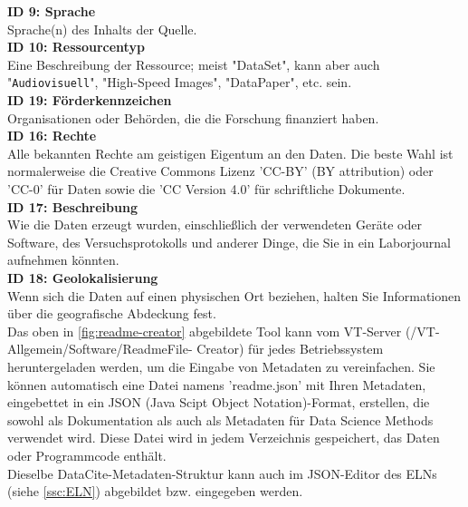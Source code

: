 %
\textbf{ID 9: Sprache} \\
Sprache(n) des Inhalts der Quelle. \\[6pt]
%
\textbf{ID 10: Ressourcentyp} \\
Eine Beschreibung der Ressource; meist "DataSet", kann aber auch "\verb+Audiovisuell+",
"High-Speed Images", "DataPaper", etc. sein.\\[6pt]
%
\textbf{ID 19: Förderkennzeichen} \\
Organisationen oder Behörden, die die Forschung finanziert haben. \\[6pt]
%
\textbf{ID 16: Rechte} \\
Alle bekannten Rechte am geistigen Eigentum an den Daten. Die beste Wahl ist
normalerweise die Creative Commons Lizenz 'CC-BY' (BY attribution) oder 'CC-0'
für Daten sowie die 'CC Version 4.0' für schriftliche Dokumente. \\[6pt]
%
\textbf{ID 17: Beschreibung} \\
Wie die Daten erzeugt wurden, einschließlich der verwendeten Geräte oder
Software, des Versuchs\-protokolls und anderer Dinge, die Sie in ein Laborjournal
aufnehmen könnten. \\[6pt]
%
\textbf{ID 18: Geolokalisierung} \\
Wenn sich die Daten auf einen physischen Ort beziehen, halten Sie Informationen
über die geografische Abdeckung fest. \\[6pt]
%
Das oben in \autoref{fig:readme-creator} abgebildete Tool kann vom VT-Server (/VT-Allgemein/Software/ReadmeFile- Creator) für jedes Betriebssystem  heruntergeladen werden, um die Eingabe von Metadaten zu vereinfachen. Sie  können automatisch eine Datei namens 'readme.json' mit Ihren Metadaten, eingebettet in ein JSON (Java Scipt Object Notation)-Format, erstellen, die sowohl als Dokumentation als auch als Metadaten für Data Science Methods verwendet wird. Diese Datei wird in jedem Verzeichnis gespeichert, das Daten oder Programmcode enthält.\\
%
Dieselbe DataCite-Metadaten-Struktur kann auch im JSON-Editor des ELNs (siehe \ref{ssc:ELN}) abgebildet bzw. eingegeben werden.
